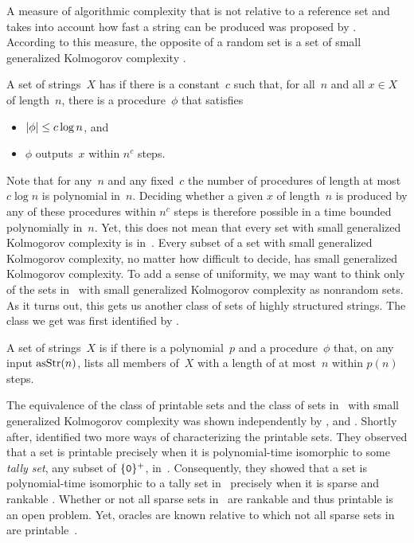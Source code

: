 A measure of algorithmic complexity that is not relative to a reference set and takes into account how fast a string can be produced was proposed by \textcite{hartmanis1983generalized}.
According to this measure, the opposite of a random set is a set of small generalized Kolmogorov complexity \parencite{balcazar1986sets,allender1988p-printable}.
\begin{definition}
  A set of strings~$X$ has  if there is a constant~$c$ such that, for all~$n$ and all $x \in X$ of length~$n$, there is a procedure~$\phi$ that satisfies
  \begin{itemize}
  \item ${\lvert\phi\rvert} \le c\log n$, and
  \item $\phi$ outputs~$x$ within $n^c$ steps.
  \end{itemize}
\end{definition}

Note that for any~$n$ and any fixed~$c$ the number of procedures of length at most $c\log n$ is polynomial in~$n$.
Deciding whether a given $x$ of length~$n$ is produced by any of these procedures within $n^c$ steps is therefore possible in a time bounded polynomially in~$n$.
Yet, this does not mean that every set with small generalized Kolmogorov complexity is in~.
Every subset of a set with small generalized Kolmogorov complexity, no matter how difficult to decide, has small generalized Kolmogorov complexity.
To add a sense of uniformity, we may want to think only of the sets in~ with small generalized Kolmogorov complexity as nonrandom sets.
As it turns out, this gets us another class of sets of highly structured strings.
The class we get was first identified by \textcite{hartmanis1984computation}.
\begin{definition}
  A set of strings~$X$ is  if there is a polynomial~$p$ and a procedure~$\phi$ that, on any input $\operatorname{asStr}(n)$, lists all members of~$X$ with a length of at most~$n$ within $p(n)$ steps.
\end{definition}

The equivalence of the class of \pdash{}printable sets and the class of sets in~ with small generalized Kolmogorov complexity was shown independently by \textcite{balcazar1986sets}, and \textcite{rubinstein1986note}.
Shortly after, \textcite{allender1988p-printable} identified two more ways of characterizing the \pdash{}printable sets.
They observed that a set is \pdash{}printable precisely when it is polynomial-time isomorphic to some \emph{tally set}, any subset of $\{\textnormal{\texttt{0}}\}^+$, in~.
Consequently, they showed that a set is polynomial-time isomorphic to a tally set in~ precisely when it is sparse and \pdash{}rankable \parencite[see also][]{goldsmith1996scalability}.
Whether or not all sparse sets in~ are \pdash{}rankable and thus \pdash{}printable is an open problem.
Yet, oracles are known relative to which not all sparse sets in~ are \pdash{}printable~\parencite{hartmanis1983generalized}.


